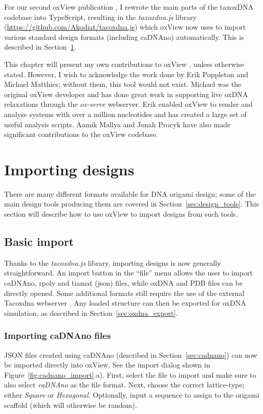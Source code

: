 For our second oxView publication \cite{bohlin2021design}, I rewrote the main parts of the taxoxDNA codebase into TypeScript, resulting in the \emph{taxoxdna.js} library (\url{https://github.com/Akodiat/tacoxdna.js}) which oxView now uses to import various standard design formats (including caDNAno) automatically. This is described in Section~\ref{sec:importing_designs}.

This chapter will present my own contributions to oxView \cite{poppleton2020design, bohlin2021design}, unless otherwise stated. However, I wish to acknowledge the work done by Erik Poppleton and Michael Matthies; without them, this tool would not exist. Michael was the original oxView developer and has done great work in supporting live oxDNA relaxations through the \emph{ox-serve} webserver. Erik enabled oxView to render and analyse systems with over a million nucleotides and has created a large set of useful analysis scripts. Aamik Mallya and Jonah Procyk have also made significant contributions to the oxView codebase. 

\section{Importing designs}
\label{sec:importing_designs}
There are many different formats available for DNA origami design; some of the main design tools producing them are covered in Section~\ref{sec:design_tools}. This section will describe how to use oxView to import designs from such tools.

\subsection{Basic import}
Thanks to the \emph{tacoxdna.js} library, importing designs is now generally straightforward. An import button in the ``file'' menu allows the user to import caDNAno, rpoly and tiamat (json) files, while oxDNA and PDB files can be directly opened. Some additional formats still require the use of the external Tacoxdna webserver \cite{taco}. Any loaded structure can then be exported for oxDNA simulation, as described in Section~\ref{sec:oxdna_export}.

\subsubsection{Importing caDNAno files}
JSON files created using caDNAno (described in Section~\ref{sec:cadnano}) can now be imported directly into oxView. See the import dialog shown in Figure~\ref{fig:cadnano_import}.a). First, select the file to import and make sure to also select \emph{caDNAno} as the file format. Next, choose the correct lattice-type; either \emph{Square} or \emph{Hexagonal}. Optionally, input a sequence to assign to the origami scaffold (which will otherwise be random).

